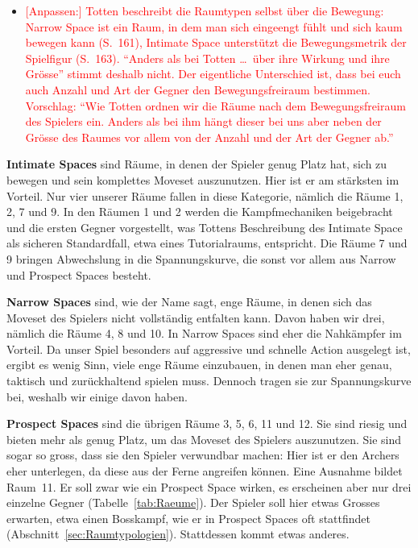 \documentclass[../Main.tex]{subfiles}
\begin{document}
\begin{itemize}[leftmargin=1.5cm]
    \item \textcolor{red}{[Anpassen:] Totten beschreibt die Raumtypen selbst über die Bewegung: Narrow Space ist ein Raum, in dem man sich eingeengt fühlt und sich kaum bewegen kann (S.~161), Intimate Space unterstützt die Bewegungsmetrik der Spielfigur (S.~163). \enquote{Anders als bei Totten \ldots\ über ihre Wirkung und ihre Grösse} stimmt deshalb nicht. Der eigentliche Unterschied ist, dass bei euch auch Anzahl und Art der Gegner den Bewegungsfreiraum bestimmen. Vorschlag: \enquote{Wie Totten ordnen wir die Räume nach dem Bewegungsfreiraum des Spielers ein. Anders als bei ihm hängt dieser bei uns aber neben der Grösse des Raumes vor allem von der Anzahl und der Art der Gegner ab.}}
\end{itemize}

\textbf{Intimate Spaces} sind Räume, in denen der Spieler genug Platz hat, sich zu bewegen und sein komplettes Moveset auszunutzen. Hier ist er am stärksten im Vorteil. Nur vier unserer Räume fallen in diese Kategorie, nämlich die Räume 1, 2, 7 und 9. In den Räumen 1 und 2 werden die Kampfmechaniken beigebracht und die ersten Gegner vorgestellt, was Tottens Beschreibung des Intimate Space als sicheren Standardfall, etwa eines Tutorialraums, entspricht. Die Räume 7 und 9 bringen Abwechslung in die Spannungskurve, die sonst vor allem aus Narrow und Prospect Spaces besteht.

\textbf{Narrow Spaces} sind, wie der Name sagt, enge Räume, in denen sich das Moveset des Spielers nicht vollständig entfalten kann. Davon haben wir drei, nämlich die Räume 4, 8 und 10. In Narrow Spaces sind eher die Nahkämpfer im Vorteil. Da unser Spiel besonders auf aggressive und schnelle Action ausgelegt ist, ergibt es wenig Sinn, viele enge Räume einzubauen, in denen man eher genau, taktisch und zurückhaltend spielen muss. Dennoch tragen sie zur Spannungskurve bei, weshalb wir einige davon haben.

\textbf{Prospect Spaces} sind die übrigen Räume 3, 5, 6, 11 und 12. Sie sind riesig und bieten mehr als genug Platz, um das Moveset des Spielers auszunutzen. Sie sind sogar so gross, dass sie den Spieler verwundbar machen: Hier ist er den Archers eher unterlegen, da diese aus der Ferne angreifen können. Eine Ausnahme bildet Raum~11. Er soll zwar wie ein Prospect Space wirken, es erscheinen aber nur drei einzelne Gegner (Tabelle~\ref{tab:Raeume}). Der Spieler soll hier etwas Grosses erwarten, etwa einen Bosskampf, wie er in Prospect Spaces oft stattfindet (Abschnitt~\ref{sec:Raumtypologien}). Stattdessen kommt etwas anderes.
\end{document}

